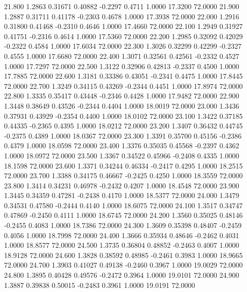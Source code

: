   21.800   1.2863   0.31671   0.40882  -0.2297   0.4711   1.0000  17.3200  72.0000
  21.900   1.2887   0.31711   0.41178  -0.2303   0.4678   1.0000  17.3938  72.0000
  22.000   1.2916   0.31800   0.41468  -0.2310   0.4646   1.0000  17.4660  72.0000
  22.100   1.2949   0.31927   0.41751  -0.2316   0.4614   1.0000  17.5360  72.0000
  22.200   1.2985   0.32092   0.42029  -0.2322   0.4584   1.0000  17.6034  72.0000
  22.300   1.3026   0.32299   0.42299  -0.2327   0.4555   1.0000  17.6680  72.0000
  22.400   1.3071   0.32561   0.42561  -0.2332   0.4527   1.0000  17.7297  72.0000
  22.500   1.3122   0.32906   0.42813  -0.2337   0.4500   1.0000  17.7885  72.0000
  22.600   1.3181   0.33386   0.43051  -0.2341   0.4475   1.0000  17.8445  72.0000
  22.700   1.3249   0.34115   0.43269  -0.2344   0.4451   1.0000  17.8974  72.0000
  22.800   1.3335   0.35417   0.43448  -0.2346   0.4428   1.0000  17.9482  72.0000
  22.900   1.3448   0.38649   0.43526  -0.2344   0.4404   1.0000  18.0019  72.0000
  23.000   1.3436   0.37931   0.43929  -0.2354   0.4400   1.0000  18.0102  72.0000
  23.100   1.3422   0.37185   0.44335  -0.2365   0.4395   1.0000  18.0212  72.0000
  23.200   1.3407   0.36432   0.44745  -0.2375   0.4389   1.0000  18.0367  72.0000
  23.300   1.3391   0.35700   0.45156  -0.2386   0.4379   1.0000  18.0598  72.0000
  23.400   1.3376   0.35035   0.45568  -0.2397   0.4362   1.0000  18.0972  72.0000
  23.500   1.3367   0.34522   0.45966  -0.2408   0.4335   1.0000  18.1598  72.0000
  23.600   1.3371   0.34244   0.46334  -0.2417   0.4295   1.0000  18.2515  72.0000
  23.700   1.3388   0.34175   0.46667  -0.2425   0.4250   1.0000  18.3559  72.0000
  23.800   1.3414   0.34231   0.46978  -0.2432   0.4207   1.0000  18.4548  72.0000
  23.900   1.3445   0.34359   0.47281  -0.2438   0.4170   1.0000  18.5377  72.0000
  24.000   1.3479   0.34531   0.47580  -0.2444   0.4140   1.0000  18.6075  72.0000
  24.100   1.3517   0.34747   0.47869  -0.2450   0.4111   1.0000  18.6745  72.0000
  24.200   1.3560   0.35025   0.48146  -0.2455   0.4083   1.0000  18.7386  72.0000
  24.300   1.3609   0.35398   0.48407  -0.2459   0.4056   1.0000  18.7998  72.0000
  24.400   1.3666   0.35934   0.48646  -0.2462   0.4031   1.0000  18.8577  72.0000
  24.500   1.3735   0.36804   0.48852  -0.2463   0.4007   1.0000  18.9128  72.0000
  24.600   1.3828   0.38592   0.48985  -0.2461   0.3983   1.0000  18.9665  72.0000
  24.700   1.3903   0.41027   0.49138  -0.2460   0.3967   1.0000  19.0029  72.0000
  24.800   1.3895   0.40428   0.49576  -0.2472   0.3964   1.0000  19.0101  72.0000
  24.900   1.3887   0.39838   0.50015  -0.2483   0.3961   1.0000  19.0191  72.0000

